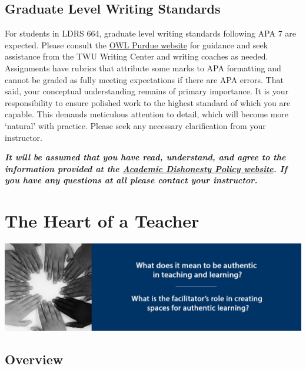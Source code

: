 \documentclass[
]{book}
\begin{document}
\hypertarget{graduate-level-writing-standards}{%
\section*{Graduate Level Writing Standards}\label{graduate-level-writing-standards}}

For students in LDRS 664, graduate level writing standards following APA 7 are expected. Please consult the \href{https://owl.purdue.edu/owl/research_and_citation/apa_style/apa_style_introduction.html}{OWL Purdue website} for guidance and seek assistance from the TWU Writing Center and writing coaches as needed. Assignments have rubrics that attribute some marks to APA formatting and cannot be graded as fully meeting expectations if there are APA errors. That said, your conceptual understanding remains of primary importance. It is your responsibility to ensure polished work to the highest standard of which you are capable. This demands meticulous attention to detail, which will become more `natural' with practice. Please seek any necessary clarification from your instructor.

\begin{caution}
\textbf{\emph{It will be assumed that you have read, understand, and
agree to the information provided at the
\href{https://www.twu.ca/about-us/policies-guidelines/university-policies/academic-misconduct-fraud}{Academic
Dishonesty Policy website}. If you have any questions at all please
contact your instructor.}}
\end{caution}

\hypertarget{the-heart-of-a-teacher}{%
\chapter{The Heart of a Teacher}\label{the-heart-of-a-teacher}}

\includegraphics{assets/unit1/LDRS664-BannerUnit1.jpg}

\hypertarget{overview}{%
\section*{Overview}\label{overview}}
\end{document}
